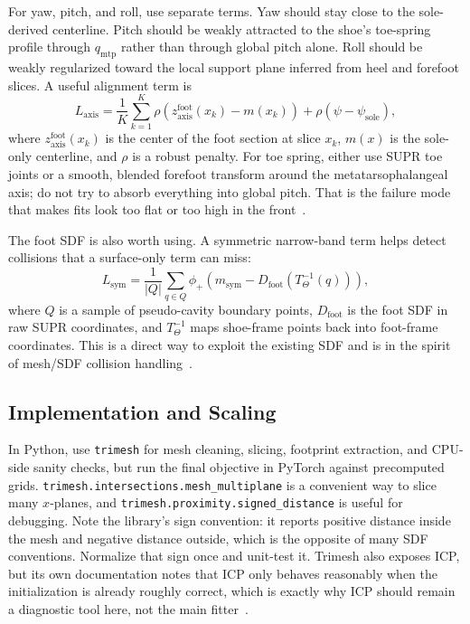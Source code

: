 \documentclass[11pt]{article}
\begin{document}
For yaw, pitch, and roll, use separate terms. Yaw should stay close to the sole-derived centerline. Pitch should be weakly attracted to the shoe's toe-spring profile through $q_{\mathrm{mtp}}$ rather than through global pitch alone. Roll should be weakly regularized toward the local support plane inferred from heel and forefoot slices. A useful alignment term is
\begin{equation}
L_{\mathrm{axis}} =
\frac{1}{K}
\sum_{k=1}^{K}
\rho\left(z^{\mathrm{foot}}_{\mathrm{axis}}(x_k)-m(x_k)\right)
+ \rho(\psi-\psi_{\mathrm{sole}}),
\end{equation}
where $z^{\mathrm{foot}}_{\mathrm{axis}}(x_k)$ is the center of the foot section at slice $x_k$, $m(x)$ is the sole-only centerline, and $\rho$ is a robust penalty. For toe spring, either use SUPR toe joints or a smooth, blended forefoot transform around the metatarsophalangeal axis; do not try to absorb everything into global pitch. That is the failure mode that makes fits look too flat or too high in the front~\cite{cad-foot-scan,toe-spring,rollover,supr-foot}.

The foot SDF is also worth using. A symmetric narrow-band term helps detect collisions that a surface-only term can miss:
\begin{equation}
L_{\mathrm{sym}} =
\frac{1}{|Q|}
\sum_{q\in Q}
\phi_+\left(m_{\mathrm{sym}}-D_{\mathrm{foot}}\left(T^{-1}_{\Theta}(q)\right)\right),
\end{equation}
where $Q$ is a sample of pseudo-cavity boundary points, $D_{\mathrm{foot}}$ is the foot SDF in raw SUPR coordinates, and $T^{-1}_{\Theta}$ maps shoe-frame points back into foot-frame coordinates. This is a direct way to exploit the existing SDF and is in the spirit of mesh/SDF collision handling~\cite{sdf-collision,sdf-contact}.

\subsection{Implementation and Scaling}

In Python, use \texttt{trimesh} for mesh cleaning, slicing, footprint extraction, and CPU-side sanity checks, but run the final objective in PyTorch against precomputed grids. \texttt{trimesh.intersections.mesh\_multiplane} is a convenient way to slice many $x$-planes, and \texttt{trimesh.proximity.signed\_distance} is useful for debugging. Note the library's sign convention: it reports positive distance inside the mesh and negative distance outside, which is the opposite of many SDF conventions. Normalize that sign once and unit-test it. Trimesh also exposes ICP, but its own documentation notes that ICP only behaves reasonably when the initialization is already roughly correct, which is exactly why ICP should remain a diagnostic tool here, not the main fitter~\cite{trimesh}.
\end{document}
